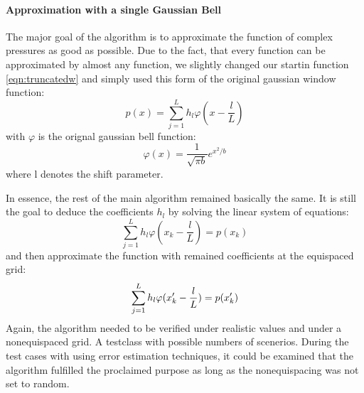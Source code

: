 \documentclass{article}
\begin{document}
\paragraph{Approximation with a single Gaussian Bell}  $ $ \\[1ex]
The major goal of the algorithm is to approximate the function of complex pressures as good as possible.
Due to the fact, that every function can be approximated by almost any function, we slightly changed our startin function \eqref{eqn:truncatedw} and simply used this form of the original gaussian window function: 
\begin{equation}
 p(x)=\sum\limits_{j=1}^L h_{l}\varphi(x-\frac{l}{L})
\end{equation}
with $\varphi$ is the orignal gaussian bell function: 
\begin{equation}
\varphi(x)= \frac{1}{\sqrt{\pi b}}  e^{x^2/b}
\end{equation}
where l denotes the shift parameter.

In essence, the rest of the main algorithm remained basically the same.
It is still the goal to deduce the coefficients $h_{l}$ by solving the linear system of equations: 
\begin{equation}
\sum\limits_{j=1}^L h_{l}\varphi(x_{k}-\frac{l}{L})=p(x_{k})
\end{equation}
and then approximate the function with remained coefficients at the equispaced grid: 
\begin{equation}
 \sum\limits_{j=1}^L h_{l}\varphi(x'_{k}-\frac{l}{L})=p(x'_{k})\notag
\end{equation}
Again, the algorithm needed to be verified under realistic values and under a nonequispaced grid. A testclass with possible numbers of scenerios. 
During the test cases with using error estimation techniques, it could be examined that the algorithm fulfilled the proclaimed purpose as long as the nonequispacing was not set to random.
\cite{Peter2011}
\cite{Mungur1969}
\printbibliography
\end{document}
